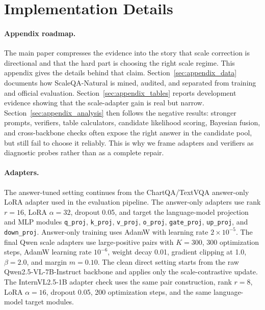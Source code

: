 \section{Implementation Details}

\paragraph{Appendix roadmap.}
The main paper compresses the evidence into the story that scale correction is directional and that the hard part is choosing the right scale regime. This appendix gives the details behind that claim. Section~\ref{sec:appendix_data} documents how ScaleQA-Natural is mined, audited, and separated from training and official evaluation. Section~\ref{sec:appendix_tables} reports development evidence showing that the scale-adapter gain is real but narrow. Section~\ref{sec:appendix_analysis} then follows the negative results: stronger prompts, verifiers, table calculators, candidate likelihood scoring, Bayesian fusion, and cross-backbone checks often expose the right answer in the candidate pool, but still fail to choose it reliably. This is why we frame adapters and verifiers as diagnostic probes rather than as a complete repair.

\paragraph{Adapters.}
The answer-tuned setting continues from the ChartQA/TextVQA answer-only LoRA adapter used in the evaluation pipeline. The answer-only adapters use rank $r=16$, LoRA $\alpha=32$, dropout 0.05, and target the language-model projection and MLP modules \texttt{q\_proj}, \texttt{k\_proj}, \texttt{v\_proj}, \texttt{o\_proj}, \texttt{gate\_proj}, \texttt{up\_proj}, and \texttt{down\_proj}. Answer-only training uses AdamW with learning rate $2\times 10^{-5}$. The final Qwen scale adapters use large-positive pairs with $K=300$, 300 optimization steps, AdamW learning rate $10^{-6}$, weight decay 0.01, gradient clipping at 1.0, $\beta=2.0$, and margin $m=0.10$. The clean direct setting starts from the raw Qwen2.5-VL-7B-Instruct backbone and applies only the scale-contrastive update. The InternVL2.5-1B adapter check uses the same pair construction, rank $r=8$, LoRA $\alpha=16$, dropout 0.05, 200 optimization steps, and the same language-model target modules.

